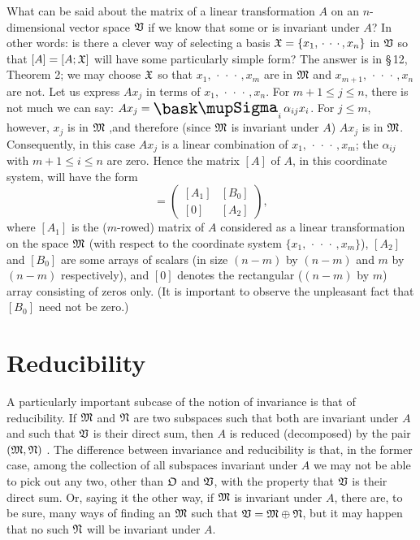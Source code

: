 What can be said about the matrix of a linear transformation \(A\) on an
\(n\)-dimensional vector space \(\mathfrak{V}\) if we know that some or is invariant
under \(A\)? In other words: is there a clever way of selecting a basis
\(\frak{X} = \{x_1, \,\cdot\,\cdot\,\cdot\,, x_n\}\) in \(\mathfrak{V}\) so that \([A] = [A;
\frak{X}]\) will have some particularly simple form? The answer is in \S\,12,
Theorem 2; we may choose \(\frak{X}\) so that \(x_1, \,\cdot\,\cdot\,\cdot\,, x_m\) are in
\(\frak{M}\) and \(x_{m+1}, \,\cdot\,\cdot\,\cdot\,, x_n\) are not. Let us express \(Ax_j\) in
terms of \(x_1, \,\cdot\,\cdot\,\cdot\,, x_n\). For \(m + 1 \leq j \leq n\), there is not much we
can say: \(Ax_j = \sumx_i \alpha_{ij} x_i\). For \(j \leq m\), however, \(x_j\)
is in \(\frak{M}\) ,and therefore (since \(\frak{M}\) is invariant under \(A\))
\(Ax_j\) is in \(\frak{M}\). Consequently, in this case \(Ax_j\) is a linear
combination of \(x_1, \,\cdot\,\cdot\,\cdot\,, x_m\); the \(\alpha_{ij}\) with \(m + 1 \leq i
\leq n\) are zero. Hence the matrix \([A]\) of \(A\), in this coordinate system,
will have the form
\begin{equation*}
    [A] = \begin{pmatrix}
        [A_1] & [B_0] \\
        [0] & [A_2]
    \end{pmatrix},
\end{equation*}
where \([A_1]\) is the (\(m\)-rowed) matrix of \(A\) considered as a linear
transformation on the space \(\frak{M}\) (with respect to the coordinate system
\(\{x_1, \,\cdot\,\cdot\,\cdot\,, x_m\}\)), \([A_2]\) and \([B_0]\) are some arrays of scalars
(in size \((n - m)\) by \((n- m)\) and \(m\) by \((n - m)\) respectively), and
\([0]\) denotes the rectangular (\((n - m)\) by \(m\)) array consisting of zeros
only. (It is important to observe the unpleasant fact that \([B_0]\) need not be
zero.)

\section{Reducibility}

A particularly important subcase of the notion of invariance is that of
reducibility. If \(\frak{M}\) and \(\frak{N}\) are two subspaces such that both
are invariant under \(A\) and such that \(\mathfrak{V}\) is their direct sum, then
\(A\) is reduced (decomposed) by the pair \((\frak{M}, \frak{N})\) . The
difference between invariance and reducibility is that, in the former case,
among the collection of all subspaces invariant under \(A\) we may not be able
to pick out any two, other than \(\frak{O}\) and \(\mathfrak{V}\), with the property
that \(\mathfrak{V}\) is their direct sum. Or, saying it the other way, if
\(\frak{M}\) is invariant under \(A\), there are, to be sure, many ways of
finding an \(\frak{M}\) such that \(\mathfrak{V} = \frak{M} \oplus \frak{N}\), but it
may happen that no such \(\frak{N}\) will be invariant under \(A\).

